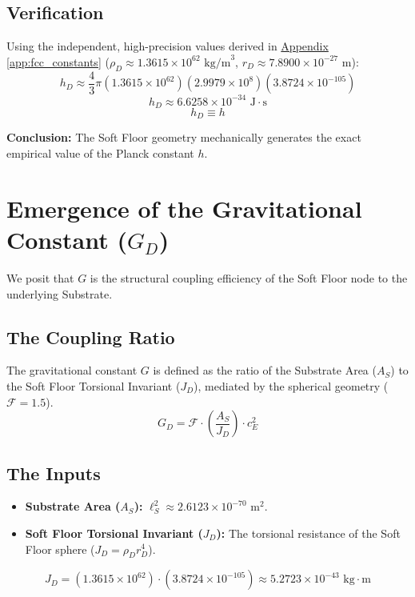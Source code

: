 \subsection{Verification}
Using the independent, high-precision values derived in \hyperref[app:fcc_constants]{Appendix \ref*{app:fcc_constants}} ($\rho_D \approx 1.3615 \times 10^{62} \text{ kg/m}^3$, $r_D \approx 7.8900 \times 10^{-27} \text{ m}$):
\begin{equation}
    h_D \approx \frac{4}{3}\pi (1.3615 \times 10^{62})(2.9979 \times 10^8)(3.8724 \times 10^{-105})
\end{equation}
\begin{equation}
    h_D \approx 6.6258 \times 10^{-34} \text{ J}\cdot\text{s}
\end{equation}
\begin{equation}
    h_D \equiv h
\end{equation}

\textbf{Conclusion:} The Soft Floor geometry mechanically generates the exact empirical value of the Planck constant $h$.

\section{Emergence of the Gravitational Constant ($G_D$)}
We posit that $G$ is the structural coupling efficiency of the Soft Floor node to the underlying Substrate.

\subsection{The Coupling Ratio}
The gravitational constant $G$ is defined as the ratio of the Substrate Area ($A_S$) to the Soft Floor Torsional Invariant ($J_D$), mediated by the spherical geometry ($\mathcal{F}=1.5$).
\begin{equation}
    G_D = \mathcal{F} \cdot \left(\frac{A_S}{J_D}\right) \cdot c_E^2
\end{equation}

\subsection{The Inputs}
\begin{itemize}
    \item \textbf{Substrate Area ($A_S$):} $\ell_S^2 \approx 2.6123 \times 10^{-70} \text{ m}^2$.
    \item \textbf{Soft Floor Torsional Invariant ($J_D$):} The torsional resistance of the Soft Floor sphere ($J_D = \rho_D r_D^4$).
\end{itemize}
\begin{equation}
    J_D = (1.3615 \times 10^{62}) \cdot (3.8724 \times 10^{-105}) \approx 5.2723 \times 10^{-43} \text{ kg}\cdot\text{m}
\end{equation}

